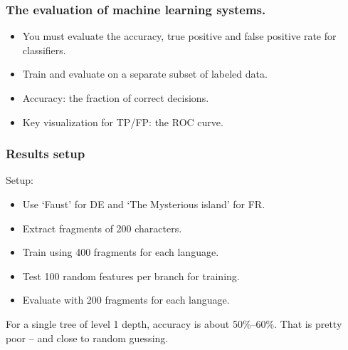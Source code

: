 \documentclass{beamer} %
\begin{document}
\begin{frame}
\frametitle{The evaluation of machine learning systems.}

\begin{itemize}
  \item You must evaluate the accuracy, true positive and false positive rate for classifiers.
  \item Train and evaluate on a separate subset of labeled data.
  \item Accuracy: the fraction of correct decisions.
  \item Key visualization for TP/FP: the ROC curve.
\end{itemize}

\end{frame}


\begin{frame}
\frametitle{Results setup}

Setup:
\begin{itemize}
  \item Use `Faust' for DE and `The Mysterious island' for FR.
  \item Extract fragments of 200 characters.
  \item Train using 400 fragments for each language.
  \item Test 100 random features per branch for training.
  \item Evaluate with 200 fragments for each language.
\end{itemize}

For a single tree of level 1 depth, accuracy is about 50\%--60\%. That is pretty poor -- and close to random guessing.

\end{frame}
\end{document}
